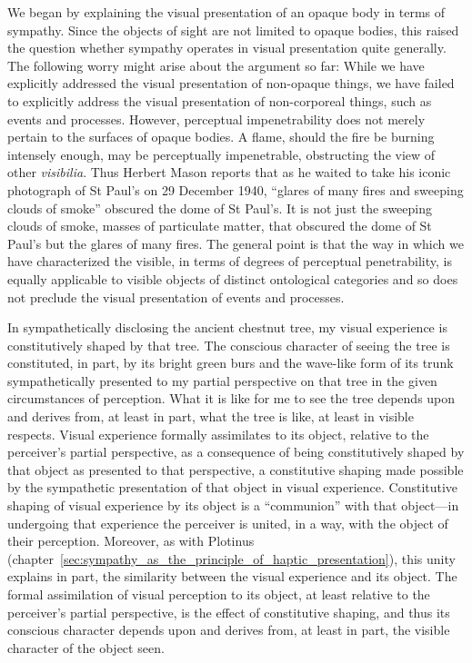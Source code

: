 We began by explaining the visual presentation of an opaque body in terms of sympathy. Since the objects of sight are not limited to opaque bodies, this raised the question whether sympathy operates in visual presentation quite generally. The following worry might arise about the argument so far: While we have explicitly addressed the visual presentation of non-opaque things, we have failed to explicitly address the visual presentation of non-corporeal things, such as events and processes. However, perceptual impenetrability does not merely pertain to the surfaces of opaque bodies. A flame, should the fire be burning intensely enough, may be perceptually impenetrable, obstructing the view of other \emph{visibilia}. Thus Herbert Mason reports that as he waited to take his iconic photograph of St Paul's on 29 December 1940, ``glares of many fires and sweeping clouds of smoke'' obscured the dome of St Paul's. It is not just the sweeping clouds of smoke, masses of particulate matter, that obscured the dome of St Paul's but the glares of many fires. The general point is that the way in which we have characterized the visible, in terms of degrees of perceptual penetrability, is equally applicable to visible objects of distinct ontological categories and so does not preclude the visual presentation of events and processes.

In sympathetically disclosing the ancient chestnut tree, my visual experience is constitutively shaped by that tree. The conscious character of seeing the tree is constituted, in part, by its bright green burs and the wave-like form of its trunk sympathetically presented to my partial perspective on that tree in the given circumstances of perception. What it is like for me to see the tree depends upon and derives from, at least in part, what the tree is like, at least in visible respects. Visual experience formally assimilates to its object, relative to the perceiver's partial perspective, as a consequence of being constitutively shaped by that object as presented to that perspective, a constitutive shaping made possible by the sympathetic presentation of that object in visual experience. Constitutive shaping of visual experience by its object is a ``communion'' with that object---in undergoing that experience the perceiver is united, in a way, with the object of their perception. Moreover, as with Plotinus (chapter~\ref{sec:sympathy_as_the_principle_of_haptic_presentation}), this unity explains in part, the similarity between the visual experience and its object. The formal assimilation of visual perception to its object, at least relative to the perceiver's partial perspective, is the effect of constitutive shaping, and thus its conscious character depends upon and derives from, at least in part, the visible character of the object seen.

